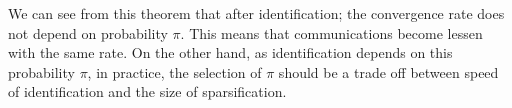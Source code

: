 We can see from this theorem that after identification; the convergence rate does not depend on probability $\pi$. This means that communications become lessen with the same rate. On the other hand, as identification depends on this probability $\pi$, in practice, the selection of $\pi$ should be a trade off between speed of identification and the size of sparsification.



